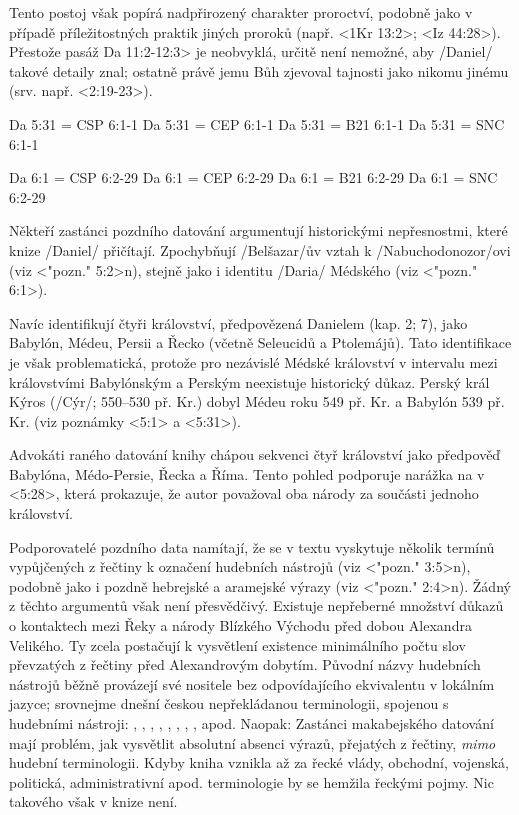 Tento postoj však popírá nadpřirozený charakter proroctví, podobně jako v případě příležitostných praktik jiných proroků (např. <1Kr 13:2>; <Iz 44:28>). Přestože pasáž  \<Da 11:2-12:3> je neobvyklá, určitě není nemožné, aby \x/Daniel/ takové detaily znal; ostatně právě jemu Bůh zjevoval tajnosti jako nikomu jinému (srv. např. <2:19-23>).  




\renum Da 5:31 = CSP 6:1-1
\renum Da 5:31 = CEP 6:1-1
\renum Da 5:31 = B21 6:1-1
\renum Da 5:31 = SNC 6:1-1 

\renum Da 6:1 = CSP 6:2-29
\renum Da 6:1 = CEP 6:2-29
\renum Da 6:1 = B21 6:2-29
\renum Da 6:1 = SNC 6:2-29


Někteří zastánci pozdního datování argumentují historickými nepřesnostmi, které knize \x/Daniel/ přičítají.
Zpochybňují \x/Belšazar/ův vztah k \x/Nabuchodonozor/ovi (viz <"pozn." 5:2>n), stejně jako i identitu  \x/Daria/ Médského (viz <"pozn." 6:1>). 

Navíc identifikují čtyři království, předpovězená Danielem (kap. 2; 7), jako Babylón, Médeu, Persii a Řecko (včetně Seleucidů a Ptolemájů). Tato identifikace je však problematická, protože pro nezávislé Médské království v intervalu mezi královstvími Babylónským a Perským neexistuje historický důkaz.
Perský král Kýros (\x/Cýr/; 550--530 př. Kr.) dobyl Médeu roku 549 př. Kr. a Babylón 539 př. Kr. (viz poznámky <5:1> a <5:31>).

Advokáti raného datování knihy chápou sekvenci čtyř království jako předpověď Babylóna, Médo-Persie, Řecka a Říma. 
Tento pohled podporuje narážka na  v <5:28>, která prokazuje, že autor považoval oba národy za součásti jednoho království.

Podporovatelé pozdního data namítají, že se v textu vyskytuje několik termínů vypůjčených z řečtiny k označení hudebních nástrojů (viz <"pozn." 3:5>n), podobně jako i  pozdně hebrejské a aramejské výrazy (viz <"pozn." 2:4>n).
Žádný z těchto argumentů však není přesvědčivý.
Existuje nepřeberné množství důkazů o kontaktech mezi Řeky a národy Blízkého Východu před dobou Alexandra Velikého. Ty zcela postačují k vysvětlení existence minimálního počtu slov převzatých z řečtiny před Alexandrovým dobytím. 
Původní názvy hudebních nástrojů běžně provázejí své nositele bez odpovídajícího ekvivalentu v lokálním jazyce; srovnejme dnešní českou nepřekládanou terminologii, spojenou s hudebními nástroji:  , , , , , , , ,  apod.
Naopak: Zastánci makabejského datování mají problém, jak vysvětlit absolutní absenci výrazů, přejatých z řečtiny, {\it mimo\/} hudební terminologii. Kdyby kniha vznikla až za řecké vlády, obchodní, vojenská, politická, administrativní apod. terminologie  by se hemžila řeckými pojmy. Nic takového však v knize není.

